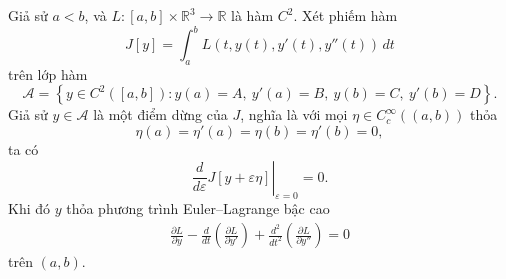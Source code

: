 ﻿\documentclass[12pt]{article}
\begin{document}
\begin{theorem}
Giả sử $a < b$, và $L:[a, b] \times \mathbb{R}^3 \to \mathbb{R}$ là hàm $C^2$. Xét phiếm hàm
\[
 J[y] = \int_a^b L(t, y(t), y'(t), y''(t))\, dt
\]
trên lớp hàm
\[
 \mathcal A = \left\{ y \in C^2([a, b]): y(a) = A,\ y'(a) = B,\ y(b) = C,\ y'(b) = D \right\}.
\]
Giả sử $y \in \mathcal A$ là một điểm dừng của $J$, nghĩa là với mọi
$\eta \in C_c^\infty((a, b))$ thỏa
\begin{equation}\label{testfunction}
\eta(a) = \eta'(a) = \eta(b) = \eta'(b) = 0,
\end{equation}
ta có
\[
 \left.\frac{d}{d\varepsilon}J[y + \varepsilon\eta]\right|_{\varepsilon = 0} = 0.
\]
Khi đó $y$ thỏa phương trình Euler--Lagrange bậc cao
\[
\boxed{
\begin{aligned}
\frac{\partial L}{\partial y}
-
\frac{d}{dt}\left(\frac{\partial L}{\partial y'}\right)
+
\frac{d^2}{dt^2}\left(\frac{\partial L}{\partial y''}\right)
 = 0
\end{aligned}
}
\]
trên $(a, b)$.
\end{theorem} 
\end{document}
